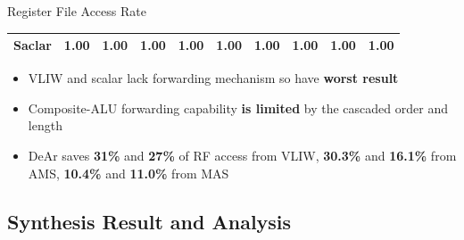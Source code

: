 \documentclass[handout]{beamer}
\begin{document}
\begin{CJK}{UTF8}{bkai}
\begin{frame}{Register File Access Rate}
\begin{table}[!ht]
{\begin{tabular}{|c|c|c|c|c|c|c|c|c|c|}
                            Saclar  &   1.00  &   1.00  &   1.00  &   1.00  &   1.00  &   1.00  &   1.00  &   1.00  &   1.00     \\ \hline 
                        \end{tabular}
                    }
                \end{table}
                \vspace{-1em}
                \begin{itemize}
                    \item <2->{VLIW and scalar lack forwarding mechanism so have \textbf{worst result}}
                    \item <3->{Composite-ALU forwarding capability \textbf{is limited} by the cascaded order and length}
                    \item <4->{DeAr saves \textbf{31\%} and \textbf{27\%} of RF access from VLIW,
                                \textbf{30.3\%} and \textbf{16.1\%} from AMS,
                                    \textbf{10.4\%} and \textbf{11.0\%} from MAS}
                \end{itemize}
            \end{frame}

            \subsection{Synthesis Result and Analysis}


\end{CJK}
\end{document}
